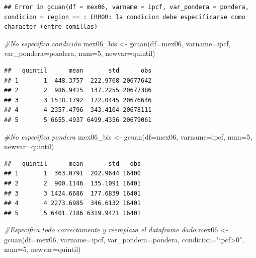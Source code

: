 \documentclass[
]{book}
\newenvironment{Shaded}{\begin{snugshade}}{\end{snugshade}}
\newcommand{\AttributeTok}[1]{\textcolor[rgb]{0.77,0.63,0.00}{#1}}
\newcommand{\CommentTok}[1]{\textcolor[rgb]{0.56,0.35,0.01}{\textit{#1}}}
\newcommand{\DecValTok}[1]{\textcolor[rgb]{0.00,0.00,0.81}{#1}}
\newcommand{\FunctionTok}[1]{\textcolor[rgb]{0.00,0.00,0.00}{#1}}
\newcommand{\NormalTok}[1]{#1}
\newcommand{\OtherTok}[1]{\textcolor[rgb]{0.56,0.35,0.01}{#1}}
\newcommand{\StringTok}[1]{\textcolor[rgb]{0.31,0.60,0.02}{#1}}
\begin{document}
\begin{verbatim}
## Error in gcuan(df = mex06, varname = ipcf, var_pondera = pondera, condicion = region == : ERROR: la condicion debe especificarse como character (entre comillas)
\end{verbatim}

\begin{Shaded}
\begin{Highlighting}[]
\CommentTok{\#No especifica condición}
\NormalTok{mex06\_bis }\OtherTok{\textless{}{-}} \FunctionTok{gcuan}\NormalTok{(}\AttributeTok{df=}\NormalTok{mex06, }\AttributeTok{varname=}\NormalTok{ipcf, }\AttributeTok{var\_pondera=}\NormalTok{pondera, }\AttributeTok{num=}\DecValTok{5}\NormalTok{, }\AttributeTok{newvar=}\NormalTok{quintil)}
\end{Highlighting}
\end{Shaded}

\begin{verbatim}
##   quintil      mean       std      obs
## 1       1  448.3757  222.9768 20677642
## 2       2  986.9415  137.2255 20677386
## 3       3 1518.1792  172.0445 20676646
## 4       4 2357.4796  343.4104 20678111
## 5       5 6655.4937 6499.4356 20679061
\end{verbatim}

\begin{Shaded}
\begin{Highlighting}[]
\CommentTok{\#No especifica pondera}
\NormalTok{mex06\_bis }\OtherTok{\textless{}{-}} \FunctionTok{gcuan}\NormalTok{(}\AttributeTok{df=}\NormalTok{mex06, }\AttributeTok{varname=}\NormalTok{ipcf, }\AttributeTok{num=}\DecValTok{5}\NormalTok{, }\AttributeTok{newvar=}\NormalTok{quintil)}
\end{Highlighting}
\end{Shaded}

\begin{verbatim}
##   quintil      mean       std   obs
## 1       1  363.0791  202.9644 16400
## 2       2  900.1146  135.1091 16401
## 3       3 1424.6686  177.6839 16401
## 4       4 2273.6985  346.6132 16401
## 5       5 6401.7186 6319.9421 16401
\end{verbatim}

\begin{Shaded}
\begin{Highlighting}[]
\CommentTok{\#Especifica todo correctamente y reemplaza el dataframe dado}
\NormalTok{mex06 }\OtherTok{\textless{}{-}} \FunctionTok{gcuan}\NormalTok{(}\AttributeTok{df=}\NormalTok{mex06, }\AttributeTok{varname=}\NormalTok{ipcf, }\AttributeTok{var\_pondera=}\NormalTok{pondera, }\AttributeTok{condicion=}\StringTok{"ipcf\textgreater{}0"}\NormalTok{, }\AttributeTok{num=}\DecValTok{5}\NormalTok{, }\AttributeTok{newvar=}\NormalTok{quintil)}
\end{Highlighting}
\end{Shaded}
\end{document}
